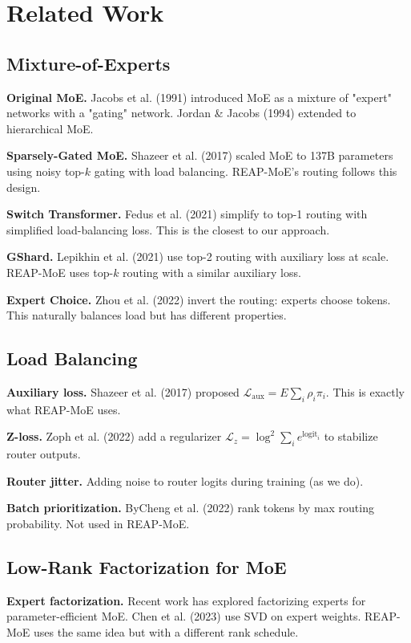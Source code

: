 \section{Related Work}

\subsection{Mixture-of-Experts}

\textbf{Original MoE.} Jacobs et al. (1991) introduced MoE as a mixture of 
"expert" networks with a "gating" network. Jordan \& Jacobs (1994) extended 
to hierarchical MoE.

\textbf{Sparsely-Gated MoE.} Shazeer et al. (2017) scaled MoE to 137B parameters 
using noisy top-$k$ gating with load balancing. REAP-MoE's routing follows 
this design.

\textbf{Switch Transformer.} Fedus et al. (2021) simplify to top-1 routing with 
simplified load-balancing loss. This is the closest to our approach.

\textbf{GShard.} Lepikhin et al. (2021) use top-2 routing with auxiliary loss 
at scale. REAP-MoE uses top-$k$ routing with a similar auxiliary loss.

\textbf{Expert Choice.} Zhou et al. (2022) invert the routing: experts choose 
tokens. This naturally balances load but has different properties.

\subsection{Load Balancing}

\textbf{Auxiliary loss.} Shazeer et al. (2017) proposed 
$\mathcal{L}_\text{aux} = E \sum_i \rho_i \pi_i$. This is exactly what REAP-MoE 
uses.

\textbf{Z-loss.} Zoph et al. (2022) add a regularizer $\mathcal{L}_z = \log^2 \sum_i e^{\text{logit}_i}$ 
to stabilize router outputs.

\textbf{Router jitter.} Adding noise to router logits during training (as we do).

\textbf{Batch prioritization.} ByCheng et al. (2022) rank tokens by max routing 
probability. Not used in REAP-MoE.

\subsection{Low-Rank Factorization for MoE}

\textbf{Expert factorization.} Recent work has explored factorizing experts for 
parameter-efficient MoE. Chen et al. (2023) use SVD on expert weights. 
REAP-MoE uses the same idea but with a different rank schedule.


